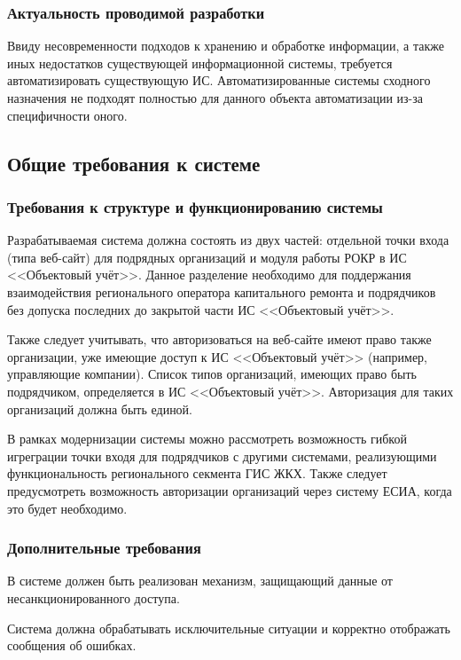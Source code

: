 \subsubsection{Актуальность проводимой разработки}

Ввиду несовременности подходов к хранению и обработке информации, а также иных недостатков существующей информационной системы, требуется автоматизировать существующую ИС.
Автоматизированные системы сходного назначения не подходят полностью для данного объекта автоматизации из-за специфичности оного.

\subsection{Общие требования к системе}

\subsubsection{Требования к структуре и функционированию системы}

Разрабатываемая система должна состоять из двух частей: отдельной точки входа (типа веб-сайт) для подрядных организаций и модуля работы РОКР в ИС <<Объектовый учёт>>.
Данное разделение необходимо для поддержания взаимодействия регионального оператора капитального ремонта и подрядчиков без допуска последних до закрытой части ИС <<Объектовый учёт>>.

Также следует учитывать, что авторизоваться на веб-сайте имеют право также организации, уже имеющие доступ к ИС <<Объектовый учёт>> (например, управляющие компании).
Список типов организаций, имеющих право быть подрядчиком, определяется в ИС <<Объектовый учёт>>.
Авторизация для таких организаций должна быть единой.

В рамках модернизации системы можно рассмотреть возможность гибкой игреграции точки входя для подрядчиков с другими системами, реализующими функциональность регионального секмента ГИС ЖКХ.
Также следует предусмотреть возможность авторизации организаций через систему ЕСИА, когда это будет необходимо.

\subsubsection{Дополнительные требования}

В системе должен быть реализован механизм, защищающий данные от несанкционированного доступа.

Система должна обрабатывать исключительные ситуации и корректно отображать сообщения об ошибках.

